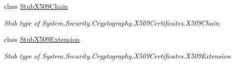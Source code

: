 \begin{DoxyCompactItemize}
class \hyperlink{class_system_1_1_security_1_1_cryptography_1_1_x509_certificates_1_1_fakes_1_1_stub_x509_chain}{Stub\-X509\-Chain}
\begin{DoxyCompactList}\small\item\em Stub type of System.\-Security.\-Cryptography.\-X509\-Certificates.\-X509\-Chain\end{DoxyCompactList}\item 
class \hyperlink{class_system_1_1_security_1_1_cryptography_1_1_x509_certificates_1_1_fakes_1_1_stub_x509_extension}{Stub\-X509\-Extension}
\begin{DoxyCompactList}\small\item\em Stub type of System.\-Security.\-Cryptography.\-X509\-Certificates.\-X509\-Extension\end{DoxyCompactList}\end{DoxyCompactItemize}

